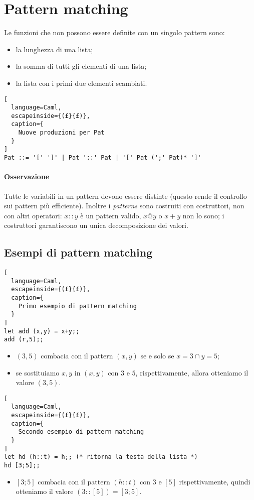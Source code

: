 \section{Pattern matching}
Le funzioni che non possono essere definite con un singolo pattern sono:
\begin{itemize}
  \item la lunghezza di una lista;
  \item la somma di tutti gli elementi di una lista;
  \item la lista con i primi due elementi scambiati.
\end{itemize}

\begin{lstlisting}[
  language=Caml,
  escapeinside={(£}{£)},
  caption={
    Nuove produzioni per Pat
  }
]
Pat ::= '[' ']' | Pat '::' Pat | '[' Pat (';' Pat)* ']'
\end{lstlisting}

\paragraph{Osservazione}
Tutte le variabili in un pattern devono essere distinte (questo
rende il controllo sui pattern più efficiente).
Inoltre i \emph{patterns} sono costruiti con costruttori, non con
altri operatori:
$x::y$ è un pattern valido, $x@y$ o $x+y$ non lo sono; i costruttori
garantiscono un unica decomposizione dei valori.

\subsection{Esempi di pattern matching}
\begin{lstlisting}[
  language=Caml,
  escapeinside={(£}{£)},
  caption={
    Primo esempio di pattern matching
  }
]
let add (x,y) = x+y;;
add (r,5);;
\end{lstlisting}
\begin{itemize}
  \item $(3,5)$ combacia con il pattern $(x,y)$ se e solo se $x=3\cap
    y=5$;
  \item se sostituiamo $x,y$ in $(x,y)$ con $3$ e $5$,
    rispettivamente, allora otteniamo il valore $(3,5)$.
\end{itemize}

\begin{lstlisting}[
  language=Caml,
  escapeinside={(£}{£)},
  caption={
    Secondo esempio di pattern matching
  }
]
let hd (h::t) = h;; (* ritorna la testa della lista *)
hd [3;5];;
\end{lstlisting}
\begin{itemize}
  \item $[3;5]$ combacia con il pattern $(h::t)$ con $3$ e $[5]$
    rispettivamente, quindi otteniamo il valore $(3::[5])=[3;5]$.
\end{itemize}


